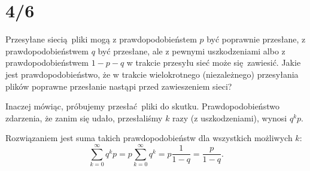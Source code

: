 \documentclass[a4paper, 12pt]{article}
\title{}
\author{Wiktor Kuchta}
\date{\vspace{-4ex}}
\begin{document}
\maketitle

\iffalse
\section*{4/2}
W urnie mamy $b$ kul białych i $c$ czarnych.
Po wyciągnięciu kuli z urny wrzucamy ją z powrotem
i dokładamy $d$ kul tego samego koloru.
Jakie jest prawdopodobieństwo wyciągnięcia $k$ kul czarnych w $n$ losowaniach?

Weźmy przykładowo $k=3$, $n=5$ i spójrzmy na prawdopodobieństwo
wybrania czarnej kuli za pierwszym, trzecim i piątym razem:
$$
\frac{c}{c+b} ·
\frac{b}{c+b+d} ·
\frac{c+d}{c+b+2d} ·
\frac{b+d}{c+b+3d} ·
\frac{c+2d}{c+b+4d}.
$$
Liczniki to liczby kul czarnych bądź białych w urnie,
a mianowniki to liczby wszystkich kul w urnie.
Rozwiązaniem jest suma wszystkich prawdopodobieństw takiej postaci.

Mianowniki zawsze będą takie same
— po $l$ losowaniach w urnie jest $c + b + ld$ kul.
Liczniki się zawsze wymnożą do $∏_{l=0}^{k-1} (c+ld) ∏_{m=0}^{n-k} (b+md)$
— po $l$ wylosowaniach kul czarnych w puli jest $c+ld$ kul czarnych,
a po $m$ wylosowaniach kul białych $b+md$ kul białych.

Liczba możliwych kolejności losowania to $\binom{n-1}{k-1}$,
bo interesują nas sytuacje, gdzie ostatnie losowanie daje nam kulę czarną.

Zatem sumarycznie prawdopodobieństwo wynosi
$$\frac{∏_{l=0}^{k-1}(c+ld) ∏_{l=0}^{n-k}(b+ld)}{∏_{l=0}^{n-1}(c+b+ld)}\binom{n-1}{k-1}.$$

\fi

\section*{4/6}

Przesyłane siecią pliki mogą z prawdopodobieństem $p$ być poprawnie przesłane,
z prawdopodobieństwem $q$ być przesłane, ale z pewnymi uszkodzeniami
albo z prawdopodobieństwem $1-p-q$ w trakcie przesyłu sieć może się zawiesić.
Jakie jest prawdopodobieństwo, że w trakcie wielokrotnego (niezależnego)
przesyłania plików poprawne przesłanie nastąpi przed zawieszeniem sieci?

Inaczej mówiąc, próbujemy przesłać pliki do skutku.
Prawdopodobieństwo zdarzenia,
że zanim się udało, przesłaliśmy $k$ razy (z uszkodzeniami),
wynosi $q^k p$.

Rozwiązaniem jest suma takich prawdopodobieństw dla wszystkich możliwych $k$:
$$∑_{k=0}^∞ q^kp = p∑_{k=0}^∞ q^k = p \frac{1}{1-q} = \frac{p}{1-q}.$$
\end{document}
